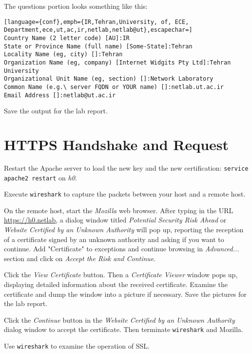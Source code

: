 \documentclass{../UTNetLab}
\begin{document}
    The questions portion looks something like this:
    {\small
    \begin{lstlisting}[language={conf},emph={IR,Tehran,University, of, ECE, Department,ece,ut,ac,ir,netlab,netlab@ut},escapechar=]
Country Name (2 letter code) [AU]:IR 
State or Province Name (full name) [Some-State]:Tehran 
Locality Name (eg, city) []:Tehran 
Organization Name (eg, company) [Internet Widgits Pty Ltd]:Tehran University 
Organizational Unit Name (eg, section) []:Network Laboratory 
Common Name (e.g.\ server FQDN or YOUR name) []:netlab.ut.ac.ir
Email Address []:netlab@ut.ac.ir
    \end{lstlisting}}

    Save the output for the lab report.

\section{HTTPS Handshake and Request}
    Restart the Apache server to load the new key and the new certification: \lstinline{service apache2 restart} on \textit{h0}.

    Execute \lstinline{wireshark} to capture the packets between your host and a remote host.

    On the remote host, start the \textit{Mozilla} web browser.
    After typing in the URL \url{https://h0.netlab}, a dialog window titled \textit{Potential Security Risk Ahead} or \textit{Website Certified by an Unknown Authority} will pop up, reporting the reception of a certificate signed by an unknown authority and asking if you want to continue.
    Add "Certificate" to exceptions and continue browsing in \textit{Advanced...} section and click on \textit{Accept the Risk and Continue}.

    Click the \textit{View Certificate} button.
    Then a \textit{Certificate Viewer} window pops up, displaying detailed information about the received certificate.
    Examine the certificate and dump the window into a picture if necessary.
    Save the pictures for the lab report.

    Click the \textit{Continue} button in the \textit{Website Certified by an Unknown Authority} dialog window to accept the certificate.
    Then terminate \lstinline{wireshark} and Mozilla.

    Use \lstinline{wireshark} to examine the operation of SSL.
\end{document}
